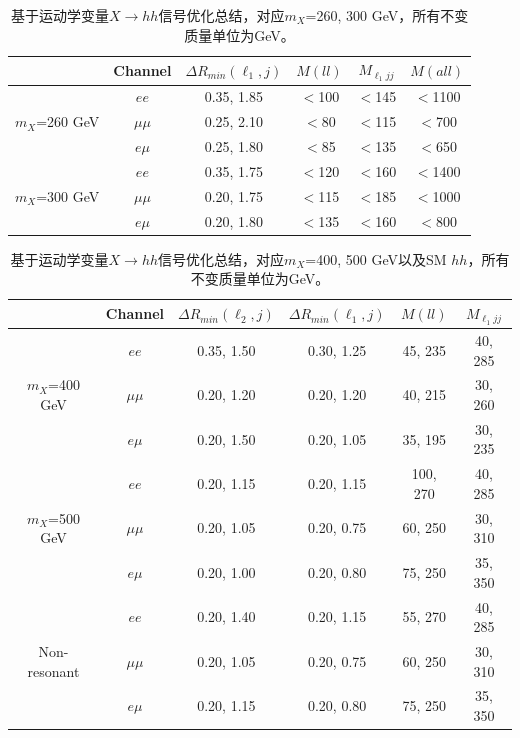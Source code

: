 \begin{table}[h]
\begin{center}
\begin{tabular}{c|c|c|c|c|c}
\hline
\hline
  &Channel &$\Delta R_{min}(\ell_{1}, j)$ &$M(ll)$  &$M_{\ell_{1}jj}$ &$M(all)$\\
\hline
\multirow{3}{2.0cm}{$m_X$=260 GeV} &$ee$  &0.35, 1.85
&$<$100
&$<$145
&$<$1100  \\
&$\mu\mu$
&0.25, 2.10
&$<$80
&$<$115
&$<$700 \\
&$e\mu$
&0.25, 1.80
&$<$85
&$<$135
&$<$650\\
\hline
\multirow{3}{2.0cm}{$m_X$=300 GeV} &$ee$
&0.35, 1.75
&$<$120
&$<$160
&$<$1400 \\
&$\mu\mu$
&0.20, 1.75
&$<$115
&$<$185
&$<$1000 \\
&$e\mu$
&0.20, 1.80
&$<$135
&$<$160
&$<$800 \\
\hline
\hline
\end{tabular}
\end{center}
\caption{基于运动学变量$X \rightarrow hh$信号优化总结，对应$m_{X}$=260, 300 GeV，所有不变质量单位为GeV。}
\label{optimization_cuts_lowmass}
\end{table}

\begin{table}[h]
\begin{center}
\begin{tabular}{c|c|c|c|c|c}
\hline
\hline
  &Channel &$\Delta R_{min}(\ell_{2}, j)$ &$\Delta R_{min}(\ell_{1}, j)$ &$M(ll)$  &$M_{\ell_{1}jj}$ \\
\hline
\multirow{3}{2.0cm}{$m_X$=400 GeV} &$ee$
&0.35, 1.50
&0.30, 1.25
&45, 235
&40, 285 \\
&$\mu\mu$
&0.20, 1.20
&0.20, 1.20
&40, 215
&30, 260 \\
&$e\mu$
&0.20, 1.50
&0.20, 1.05
&35, 195
&30, 235 \\
\hline
\multirow{3}{2.0cm}{$m_X$=500 GeV} &$ee$
&0.20, 1.15
&0.20, 1.15
&100, 270
&40, 285 \\
&$\mu\mu$
&0.20, 1.05
&0.20, 0.75
&60, 250
&30, 310 \\
&$e\mu$
&0.20, 1.00
&0.20, 0.80
&75, 250
&35, 350 \\
\hline
\multirow{3}{2.0cm}{Non-resonant} & $ee$
&0.20, 1.40
&0.20, 1.15
&55, 270
&40, 285 \\
&$\mu\mu$
&0.20, 1.05
&0.20, 0.75
&60, 250
&30, 310 \\
&$e\mu$
&0.20, 1.15
&0.20, 0.80
&75, 250
&35, 350 \\
\hline
\hline
\end{tabular}
\end{center}
\caption{基于运动学变量$X \rightarrow hh$信号优化总结，对应$m_{X}$=400, 500 GeV以及SM $hh$，所有不变质量单位为GeV。}
\label{optimization_cuts_highmass}
\end{table}
 
